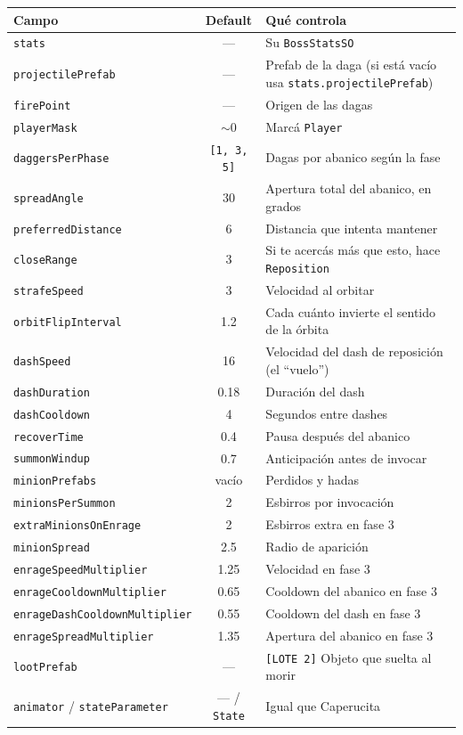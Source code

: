 \documentclass[a4paper,12pt]{article}
\newcommand{\code}[1]{\texttt{#1}}
\begin{document}
\begin{center}
\begin{longtable}{|l|c|p{6.2cm}|}
\hline
\textbf{Campo} & \textbf{Default} & \textbf{Qué controla} \\
\hline
\endhead
\code{stats} & --- & Su \code{BossStatsSO} \\
\hline
\code{projectilePrefab} & --- & Prefab de la daga (si está vacío usa \code{stats.projectilePrefab}) \\
\hline
\code{firePoint} & --- & Origen de las dagas \\
\hline
\code{playerMask} & $\sim$0 & Marcá \code{Player} \\
\hline
\code{daggersPerPhase} & \code{[1, 3, 5]} & Dagas por abanico según la fase \\
\hline
\code{spreadAngle} & 30 & Apertura total del abanico, en grados \\
\hline
\code{preferredDistance} & 6 & Distancia que intenta mantener \\
\hline
\code{closeRange} & 3 & Si te acercás más que esto, hace \code{Reposition} \\
\hline
\code{strafeSpeed} & 3 & Velocidad al orbitar \\
\hline
\code{orbitFlipInterval} & 1.2 & Cada cuánto invierte el sentido de la órbita \\
\hline
\code{dashSpeed} & 16 & Velocidad del dash de reposición (el ``vuelo'') \\
\hline
\code{dashDuration} & 0.18 & Duración del dash \\
\hline
\code{dashCooldown} & 4 & Segundos entre dashes \\
\hline
\code{recoverTime} & 0.4 & Pausa después del abanico \\
\hline
\code{summonWindup} & 0.7 & Anticipación antes de invocar \\
\hline
\code{minionPrefabs} & vacío & Perdidos y hadas \\
\hline
\code{minionsPerSummon} & 2 & Esbirros por invocación \\
\hline
\code{extraMinionsOnEnrage} & 2 & Esbirros extra en fase 3 \\
\hline
\code{minionSpread} & 2.5 & Radio de aparición \\
\hline
\code{enrageSpeedMultiplier} & 1.25 & Velocidad en fase 3 \\
\hline
\code{enrageCooldownMultiplier} & 0.65 & Cooldown del abanico en fase 3 \\
\hline
\code{enrageDashCooldownMultiplier} & 0.55 & Cooldown del dash en fase 3 \\
\hline
\code{enrageSpreadMultiplier} & 1.35 & Apertura del abanico en fase 3 \\
\hline
\code{lootPrefab} & --- & \code{[LOTE 2]} Objeto que suelta al morir \\
\hline
\code{animator} / \code{stateParameter} & --- / \code{State} & Igual que Caperucita \\
\hline
\end{longtable}
\end{center}
\end{document}
